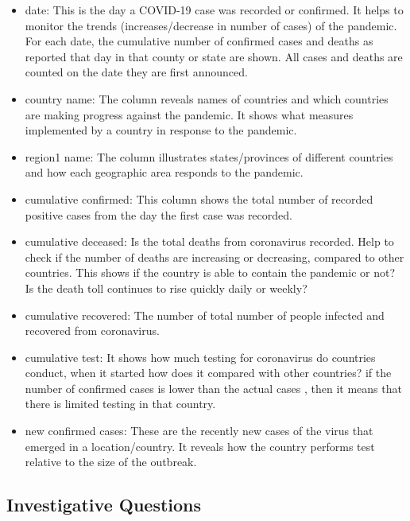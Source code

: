 \documentclass[12pt]{article}
\begin{document}
\begin{itemize}
    \item date: This is the day a COVID-19 case was recorded or confirmed. It helps to monitor the trends (increases/decrease in number of cases) of the pandemic. For each date, the cumulative number of confirmed cases and deaths as reported that day in that county or state are shown. All cases and deaths are counted on the date they are first announced.
    
    \item country name: The column reveals names of countries and which countries are making progress against the pandemic. It shows what measures implemented by a country in response to the pandemic.
    
    \item region1 name:  The column illustrates states/provinces of different countries and how each geographic area responds to the pandemic.
    
    \item cumulative confirmed: This column shows the total number of recorded positive cases from the day the first case was recorded. 
      
    \item cumulative deceased:  Is the total deaths from coronavirus recorded. Help to check if the number of deaths are increasing or decreasing, compared to other countries. This shows if the country is able to contain the pandemic or not? Is the death toll continues to rise quickly daily or weekly?
    
    \item cumulative recovered: The number of total number of people infected and recovered from coronavirus.
      
     \item cumulative test:  It shows how much testing for coronavirus do countries conduct, when it started how does it compared with other countries? if the number of confirmed cases is lower than the actual cases , then it means that there is limited testing in that country.
      
    \item new confirmed cases: These are the recently new cases of the virus that emerged in a location/country. It reveals how the country performs test relative to the size of the outbreak.
    
\end{itemize}


\subsection{Investigative Questions}
\end{document}
